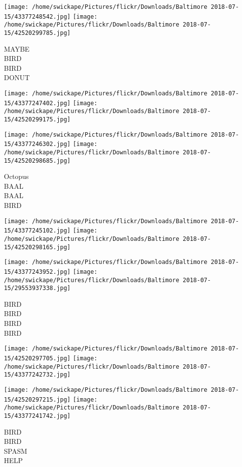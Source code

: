 \documentclass[10pt,letterpaper]{article}
\begin{document}
\texttt{[image: /home/swickape/Pictures/flickr/Downloads/Baltimore 2018-07-15/43377248542.jpg]}
\texttt{[image: /home/swickape/Pictures/flickr/Downloads/Baltimore 2018-07-15/42520299785.jpg]}

MAYBE\\
BIRD\\
BIRD\\
DONUT
\pagebreak

\texttt{[image: /home/swickape/Pictures/flickr/Downloads/Baltimore 2018-07-15/43377247402.jpg]}
\texttt{[image: /home/swickape/Pictures/flickr/Downloads/Baltimore 2018-07-15/42520299175.jpg]}

\texttt{[image: /home/swickape/Pictures/flickr/Downloads/Baltimore 2018-07-15/43377246302.jpg]}
\texttt{[image: /home/swickape/Pictures/flickr/Downloads/Baltimore 2018-07-15/42520298685.jpg]}

Octopus\\
BAAL\\
BAAL\\
BIRD
\pagebreak

\texttt{[image: /home/swickape/Pictures/flickr/Downloads/Baltimore 2018-07-15/43377245102.jpg]}
\texttt{[image: /home/swickape/Pictures/flickr/Downloads/Baltimore 2018-07-15/42520298165.jpg]}

\texttt{[image: /home/swickape/Pictures/flickr/Downloads/Baltimore 2018-07-15/43377243952.jpg]}
\texttt{[image: /home/swickape/Pictures/flickr/Downloads/Baltimore 2018-07-15/29553937338.jpg]}

BIRD\\
BIRD\\
BIRD\\
BIRD
\pagebreak

\texttt{[image: /home/swickape/Pictures/flickr/Downloads/Baltimore 2018-07-15/42520297705.jpg]}
\texttt{[image: /home/swickape/Pictures/flickr/Downloads/Baltimore 2018-07-15/43377242732.jpg]}

\texttt{[image: /home/swickape/Pictures/flickr/Downloads/Baltimore 2018-07-15/42520297215.jpg]}
\texttt{[image: /home/swickape/Pictures/flickr/Downloads/Baltimore 2018-07-15/43377241742.jpg]}

BIRD\\
BIRD\\
SPASM\\
HELP
\pagebreak
\end{document}
